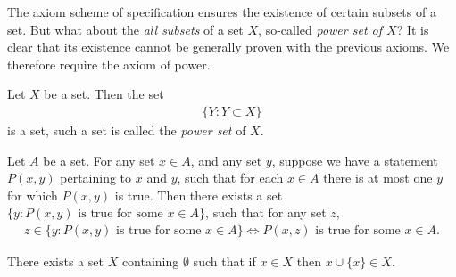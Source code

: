 The axiom scheme of specification ensures the existence of certain subsets of a set. But what about the \emph{all subsets} of a set $X$, so-called \emph{power set of $X$}? It is clear that its existence cannot be generally proven with the previous axioms. We therefore require the axiom of power.

\begin{axiom}
    Let $X$ be a set. Then the set
    \begin{align*}
        \{Y : Y \subset X\}
    \end{align*}
    is a set, such a set is called the \emph{power set} of $X$.
\end{axiom}

\begin{axiom}
    Let $A$ be a set. For any set $x \in A$, and any set $y$, suppose we have a statement $P(x, y)$ pertaining to $x$ and $y$, such that for each $x \in A$ there is at most one $y$ for which $P(x, y)$ is true. Then there exists a set $\{y : P(x, y) \text{ is true for some } x \in A\}$, such that for any set $z$,
    \begin{align*}
        z \in \{y : P(x, y) \text{ is true for some } x \in A\}
        \Longleftrightarrow
        P(x, z) \text{ is true for some } x \in A.
    \end{align*}
\end{axiom}

\begin{axiom}
    There exists a set $X$ containing $\emptyset$ such that if $x \in X$ then $x \cup \{x\} \in X$.
\end{axiom}

\begin{comment}
With axioms of pairing and union, one can define singleton $\{x\}$, pair set $\{x, y\}$, triple set $\{x, y, z\} := \{x, y\} \cup \{z\}$, and so forth. This ``and so forth'' can be specified by providing instructions on how to define the $n$-tuple set successively. The instruction can take the form of a so-called \emph{inductive definition}:

\begin{definition}
    For every $n \geq 2$, we define
    \begin{align*}
        \{x_1, \cdots, x_n\} := \{x_1, \cdots, x_{n - 1}\} \cup \{x_n\}.
    \end{align*}
\end{definition}

We take this definition as an opportunity to incorporate some fundamental remarks about the \emph{naive natural numbers} and certain induction principles associated with them.

The \emph{naive natural numbers} are not elements of any sets for us; therefore, we will strictly distinguish them from the natural numbers in the set-theoretical sense, which we introduce in Section \ref{}. They are a tool for us to talk about our investigation of the sets, for example, about the expressions of set-theoretical language, about definitions in this language, and so on. The role of naive natural numbers is, as they say, of a meta-linguistic nature.
\end{comment}

